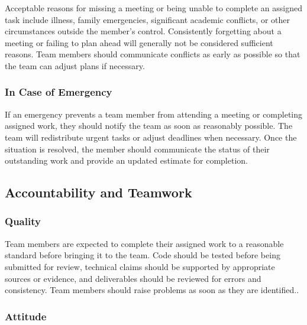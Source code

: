 \documentclass{article}
\begin{document}
Acceptable reasons for missing a meeting or being unable to complete an assigned task include illness, family emergencies, significant academic conflicts, or other circumstances outside the member's control. Consistently forgetting about a meeting or failing to plan ahead will generally not be considered sufficient reasons. Team members should communicate conflicts as early as possible so that the team can adjust plans if necessary.

\subsubsection*{In Case of Emergency}


If an emergency prevents a team member from attending a meeting or completing assigned work, they should notify the team as soon as reasonably possible. The team will redistribute urgent tasks or adjust deadlines when necessary. Once the situation is resolved, the member should communicate the status of their outstanding work and provide an updated estimate for completion.

\subsection*{Accountability and Teamwork}

\subsubsection*{Quality} 


Team members are expected to complete their assigned work to a reasonable standard before bringing it to the team. Code should be tested before being submitted for review, technical claims should be supported by appropriate sources or evidence, and deliverables should be reviewed for errors and consistency. Team members should raise problems as soon as they are identified..

\subsubsection*{Attitude}
\end{document}
